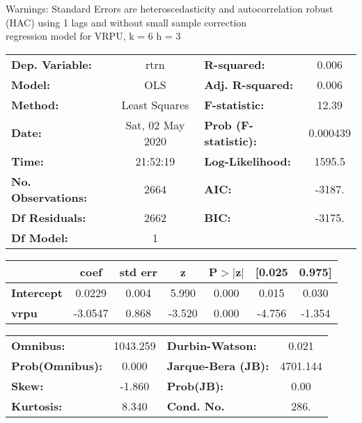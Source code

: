 Warnings: \newline
 [1] Standard Errors are heteroscedasticity and autocorrelation robust (HAC) using 1 lags and without small sample correction\\ 

regression model for VRPU, k = 6 h = 3\begin{center}
\begin{tabular}{lclc}
\toprule
\textbf{Dep. Variable:}    &       rtrn       & \textbf{  R-squared:         } &     0.006   \\
\textbf{Model:}            &       OLS        & \textbf{  Adj. R-squared:    } &     0.006   \\
\textbf{Method:}           &  Least Squares   & \textbf{  F-statistic:       } &     12.39   \\
\textbf{Date:}             & Sat, 02 May 2020 & \textbf{  Prob (F-statistic):} &  0.000439   \\
\textbf{Time:}             &     21:52:19     & \textbf{  Log-Likelihood:    } &    1595.5   \\
\textbf{No. Observations:} &        2664      & \textbf{  AIC:               } &    -3187.   \\
\textbf{Df Residuals:}     &        2662      & \textbf{  BIC:               } &    -3175.   \\
\textbf{Df Model:}         &           1      & \textbf{                     } &             \\
\bottomrule
\end{tabular}
\begin{tabular}{lcccccc}
                   & \textbf{coef} & \textbf{std err} & \textbf{z} & \textbf{P$> |$z$|$} & \textbf{[0.025} & \textbf{0.975]}  \\
\midrule
\textbf{Intercept} &       0.0229  &        0.004     &     5.990  &         0.000        &        0.015    &        0.030     \\
\textbf{vrpu}      &      -3.0547  &        0.868     &    -3.520  &         0.000        &       -4.756    &       -1.354     \\
\bottomrule
\end{tabular}
\begin{tabular}{lclc}
\textbf{Omnibus:}       & 1043.259 & \textbf{  Durbin-Watson:     } &    0.021  \\
\textbf{Prob(Omnibus):} &   0.000  & \textbf{  Jarque-Bera (JB):  } & 4701.144  \\
\textbf{Skew:}          &  -1.860  & \textbf{  Prob(JB):          } &     0.00  \\
\textbf{Kurtosis:}      &   8.340  & \textbf{  Cond. No.          } &     286.  \\
\bottomrule
\end{tabular}
\end{center}

